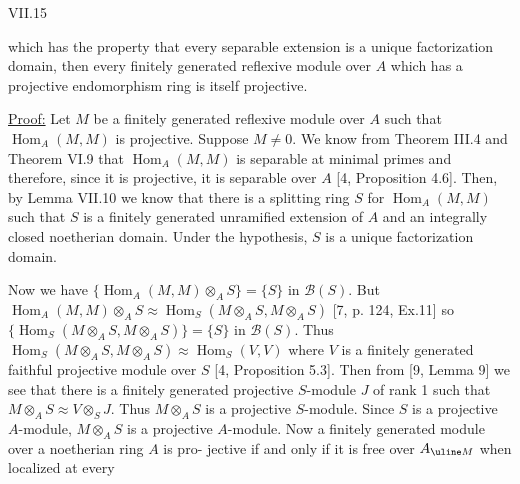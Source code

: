 VII.15

which has the property that every separable extension is a unique
factorization domain, then every finitely generated reflexive module
over $A$ which has a projective endomorphism ring is itself projective.

\uline{Proof:} Let $M$ be a finitely generated reflexive module over $A$
such that $\operatorname{Hom}_A(M,M)$ is projective. Suppose $M\neq0$. We know
from Theorem III.4 and Theorem VI.9 that $\operatorname{Hom}_A(M,M)$ is
separable at minimal primes and therefore, since it is projective,
it is separable over $A$ [4, Proposition 4.6]. Then, by Lemma VII.10
we know that there is a splitting ring $S$ for $\operatorname{Hom}_A(M,M)$ such that
$S$ is a finitely generated unramified extension of $A$ and an integrally
closed noetherian domain. Under the hypothesis, $S$ is a unique
factorization domain.

Now we have $\{\operatorname{Hom}_A(M,M)\otimes_A S\}=\{S\}$ in $\mathcal B(S)$. But
$\operatorname{Hom}_A(M,M)\otimes_A S\approx\operatorname{Hom}_S(M\otimes_A S,M\otimes_A S)$ [7, p. 124, Ex.11] so
$\{\operatorname{Hom}_S(M\otimes_A S,M\otimes_A S)\}=\{S\}$ in $\mathcal B(S)$. Thus
$\operatorname{Hom}_S(M\otimes_A S,M\otimes_A S)\approx\operatorname{Hom}_S(V,V)$
where $V$ is a finitely generated faithful projective
module over $S$ [4, Proposition 5.3]. Then from [9, Lemma 9] we
see that there is a finitely generated projective $S$-module $J$ of rank 1
such that $M\otimes_A S\approx V\otimes_S J$. Thus $M\otimes_A S$ is a projective $S$-module.
Since $S$ is a projective $A$-module, $M\otimes_A S$ is a projective $A$-module.
Now a finitely generated module over a noetherian ring $A$ is pro-
jective if and only if it is free over $A_{\uline M}$ when localized at every
